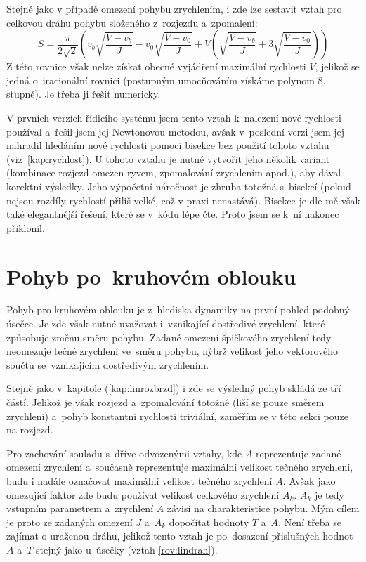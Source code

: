 		Stejně jako v případě omezení pohybu zrychlením, i zde lze sestavit vztah pro celkovou dráhu pohybu složeného z~rozjezdu a~zpomalení:
		\begin{equation}
				S=\frac{\pi}{2\sqrt{2}} \left(v_b\sqrt{\frac{V-v_b}{J}}-v_0\sqrt{\frac{V-v_0}{J}}+V\left(\sqrt{\frac{V-v_b}{J}}+3\sqrt{\frac{V-v_0}{J}}\right)\right)
		\end{equation} 
		Z této rovnice však nelze získat obecné vyjádření maximální rychlosti $V$, jelikož se jedná o~iracionální rovnici (postupným umocňováním získáme polynom 8. stupně). Je třeba ji řešit numericky.
		
		V prvních verzích řídicího systému jsem tento vztah k~nalezení nové rychlosti používal a~řešil jsem jej Newtonovou metodou, avšak v~poslední verzi jsem jej nahradil hledáním nové rychlosti pomocí bisekce bez použití tohoto vztahu (viz~\ref{kap:rychlost}). U tohoto vztahu je nutné vytvořit jeho několik variant (kombinace rozjezd omezen ryvem, zpomalování zrychlením apod.), aby dával korektní výsledky. Jeho výpočetní náročnost je zhruba totožná s~bisekcí (pokud nejsou rozdíly rychlostí přiliš velké, což v praxi nenastává). Bisekce je dle mě však také elegantnější řešení, které se v~kódu lépe čte. Proto jsem se k~ní nakonec přiklonil.
	
	\section{Pohyb po~kruhovém oblouku}
	
	Pohyb pro kruhovém oblouku je z~hlediska dynamiky na první pohled podobný úsečce. Je zde však nutné uvažovat i~vznikající dostředivé zrychlení, které způsobuje změnu směru pohybu. Zadané omezení špičkového zrychlení tedy neomezuje tečné zrychlení ve~směru pohybu, nýbrž velikost jeho vektorového součtu se~vznikajícím dostředivým zrychlením.
	
	Stejně jako v~kapitole  (\ref{kap:linrozbrzd}) i zde se výsledný pohyb skládá ze tří částí. Jelikož je však rozjezd a~zpomalování totožné (liší se pouze směrem zrychlení) a~pohyb konstantní rychlostí triviální, zaměřím se v této sekci pouze na rozjezd.
	
	Pro zachování souladu s~dříve odvozenými vztahy, kde $A$ reprezentuje zadané omezení zrychlení a~současně reprezentuje maximální velikost tečného zrychlení, budu i nadále označovat maximální velikost tečného zrychlení $A$. Avšak jako omezující faktor zde budu používat velikost celkového zrychlení $A_k$. $A_k$ je tedy vstupním parametrem a~zrychlení $A$ závisí na charakteristice pohybu.  Mým cílem je proto ze zadaných omezení $J$ a~$A_k$ dopočítat hodnoty $T$ a~$A$. Není třeba se zajímat o uraženou dráhu, jelikož tento vztah je po~dosazení přislušných hodnot $A$ a~$T$ stejný jako u~úsečky (vztah \ref{rov:lindrah}).
	

